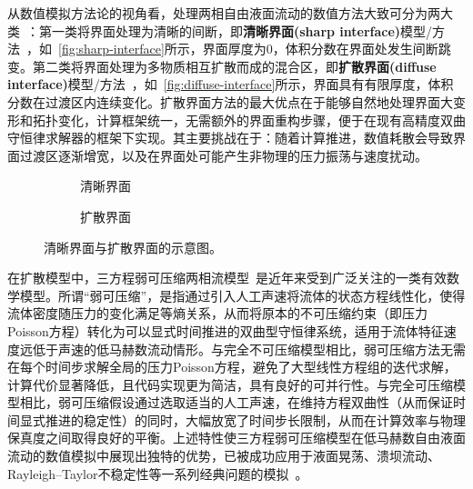 \documentclass[12pt,a4paper]{article}
\numberwithin{equation}{section}    %
\begin{document}
从数值模拟方法论的视角看，处理两相自由液面流动的数值方法大致可分为两大类~\cite{RICHARDSAUREL20091678}：第一类将界面处理为清晰的间断，即\textbf{清晰界面(sharp interface)}模型/方法~\cite{sussman1994level,sussman2007sharp}，如~\autoref{fig:sharp-interface}所示，界面厚度为0，体积分数在界面处发生间断跳变。第二类将界面处理为多物质相互扩散而成的混合区，即\textbf{扩散界面(diffuse interface)}模型/方法~\cite{murrone2005five,kapila2001two}，如~\autoref{fig:diffuse-interface}所示，界面具有有限厚度，体积分数在过渡区内连续变化。扩散界面方法的最大优点在于能够自然地处理界面大变形和拓扑变化，计算框架统一，无需额外的界面重构步骤，便于在现有高精度双曲守恒律求解器的框架下实现。其主要挑战在于：随着计算推进，数值耗散会导致界面过渡区逐渐增宽，以及在界面处可能产生非物理的压力振荡与速度扰动。

 
\begin{figure}[!htbp]
    \centering
    \begin{subfigure}[t]{0.48\linewidth}
        \centering
        
        \caption{清晰界面}
        \label{fig:sharp-interface}
    \end{subfigure}
    \hfill
    \begin{subfigure}[t]{0.48\linewidth}
        \centering
        
        \caption{扩散界面}
        \label{fig:diffuse-interface}
    \end{subfigure}
    \caption{清晰界面与扩散界面的示意图。}
    \label{fig:interface-comparison}
\end{figure}



在扩散模型中，三方程弱可压缩两相流模型~\cite{Chanteperdrix2004,grenier2013accurate}是近年来受到广泛关注的一类有效数学模型。所谓``弱可压缩''，是指通过引入人工声速将流体的状态方程线性化，使得流体密度随压力的变化满足等熵关系，从而将原本的不可压缩约束（即压力Poisson方程）转化为可以显式时间推进的双曲型守恒律系统，适用于流体特征速度远低于声速的低马赫数流动情形。与完全不可压缩模型相比，弱可压缩方法无需在每个时间步求解全局的压力Poisson方程，避免了大型线性方程组的迭代求解，计算代价显著降低，且代码实现更为简洁，具有良好的可并行性。与完全可压缩模型相比，弱可压缩假设通过选取适当的人工声速，在维持方程双曲性（从而保证时间显式推进的稳定性）的同时，大幅放宽了时间步长限制，从而在计算效率与物理保真度之间取得良好的平衡。上述特性使三方程弱可压缩模型在低马赫数自由液面流动的数值模拟中展现出独特的优势，已被成功应用于液面晃荡、溃坝流动、Rayleigh--Taylor不稳定性等一系列经典问题的模拟~\cite{li2020finite,li2022simplified}。
\end{document}
